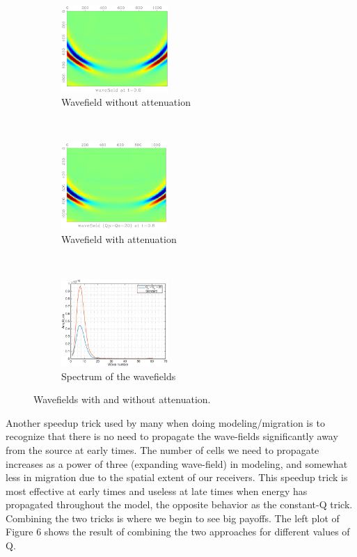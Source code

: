 \documentclass{paris17}
\begin{document}
\begin{figure}[h]
    \centering
    \begin{subfigure}[b]{0.3\textwidth}
        \centering
        \includegraphics[height=1.3in]{./fig/std.pdf}
        \caption{Wavefield without attenuation}
    \end{subfigure}%
    ~ 
    \begin{subfigure}[b]{0.3\textwidth}
        \centering
        \includegraphics[height=1.3in]{./fig/q20.pdf}
        \caption{Wavefield with attenuation}
    \end{subfigure}
    ~ 
    \begin{subfigure}[b]{0.3\textwidth}
        \centering
        \includegraphics[height=1.3in]{./fig/spec.eps}
        \caption{Spectrum of the wavefields}
    \end{subfigure}
    \caption{Wavefields with and without attenuation.}
\end{figure}

Another speedup trick used by many when doing modeling/migration is to recognize that there is no need to propagate the wave-fields significantly away from the source at early times. The number of cells we need to propagate increases as a power of three (expanding wave-field) in modeling, and somewhat less in migration due to the spatial extent of our receivers. This speedup trick is most effective at early times and useless at late times when energy has propagated throughout the model, the opposite behavior as the constant-Q trick. Combining the two tricks is where we begin to see big payoffs. The left plot of Figure 6 shows the result of combining the two approaches for different values of Q.
\end{document}
